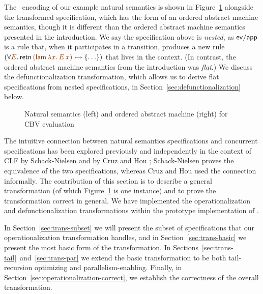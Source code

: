 The \sls~encoding of our example natural semantics is shown in
Figure~\ref{fig:example-transform-cbv} alongside the transformed
specification, which has the form of an ordered abstract machine
semantics, though it is different than the ordered abstract machine
semantics presented in the introduction. We say the specification
above is {\it nested}, as ${\sf ev/app}$ is a rule that, when it
participates in a transition, produces a new rule $(\forall
\lf{E}.\,{\sf retn}\,\lf{({\sf lam}\,\lambda x.\,E\,x)} \lefti \{
\ldots \})$ that lives in the context. (In contrast, the ordered
abstract machine semantics from the introduction was {\it flat}.)  We
discuss the defunctionalization transformation, which allows us to
derive flat specifications from nested specifications, in
Section~\ref{sec:defunctionalization} below.

\begin{figure}
\begin{minipage}[b]{0.36\linewidth}
\end{minipage}
\hspace{0.5cm}
\begin{minipage}[b]{0.64\linewidth}
\end{minipage}
\caption{Natural semantics (left) and ordered abstract machine (right) for 
CBV evaluation}
\label{fig:example-transform-cbv}
\end{figure}

The intuitive connection between natural semantics specifications and
concurrent specifications has been explored previously and
independently in the context of CLF by Schack-Nielsen
\cite{schacknielsen07induction} and by Cruz and Hou
\cite{cruz12parallel}; Schack-Nielsen proves the equivalence of the
two specifications, whereas Cruz and Hou used the connection
informally. The contribution of this section is to describe a general
transformation (of which Figure~\ref{fig:example-transform-cbv} is one
instance) and to prove the transformation correct in general. We have
implemented the operationalization
and defunctionalization transformations within the prototype
implementation of \sls.

In Section~\ref{sec:trans-subset} we will present the subset of
specifications that our operationalization transformation handles, and
in Section~\ref{sec:trans-basic} we present the most basic form of the
transformation.  In
Sections~\ref{sec:trans-tail}~and~\ref{sec:trans-par} we extend the
basic transformation to be both tail-recursion optimizing and
parallelism-enabling. Finally, in
Section~\ref{sec:operationalization-correct}, we establish the
correctness of the overall transformation.

